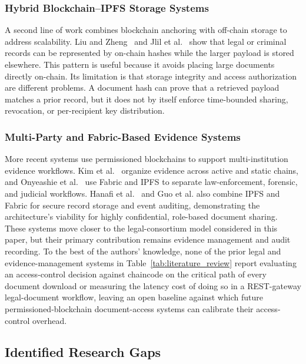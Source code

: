 \documentclass{ieeeaccess}
\begin{document}
\subsubsection{Hybrid Blockchain--IPFS Storage Systems}

A second line of work combines blockchain anchoring with off-chain
storage to address scalability. Liu and Zheng~\cite{liu2024blockchain}
and Jlil et al.~\cite{jlil2024blockchain} show that legal or criminal
records can be represented by on-chain hashes while the larger payload
is stored elsewhere. This pattern is useful because it avoids placing
large documents directly on-chain. Its limitation is that storage
integrity and access authorization are different problems. A document
hash can prove that a retrieved payload matches a prior record, but it
does not by itself enforce time-bounded sharing, revocation, or
per-recipient key distribution.

\subsubsection{Multi-Party and Fabric-Based Evidence Systems}

More recent systems use permissioned blockchains to support
multi-institution evidence workflows. Kim et al.~\cite{twoLevelBlockchain}
organize evidence across active and static chains, and Onyeashie
et al.~\cite{onyeashie2025fabricEvidence} use Fabric and IPFS to separate law-enforcement, forensic, and judicial workflows. Hanafi et al.~\cite{hanafi2021ipfschain} and Guo et al. \cite{guo2024efficient} also combine IPFS and Fabric for secure record storage and event auditing, demonstrating the architecture's viability for highly confidential, role-based document sharing. These systems move closer to the legal-consortium model considered in this paper, but their
primary contribution remains evidence management and audit recording. To the best of the authors' knowledge, none of the prior legal and evidence-management systems in Table~\ref{tab:literature_review} report evaluating an access-control decision against chaincode on the critical path of every document download or measuring the latency cost of doing so in a REST-gateway legal-document workflow, leaving an open baseline against which future permissioned-blockchain document-access systems can calibrate their access-control overhead.

\subsection{Identified Research Gaps}
\label{sec:gaps}
\end{document}
